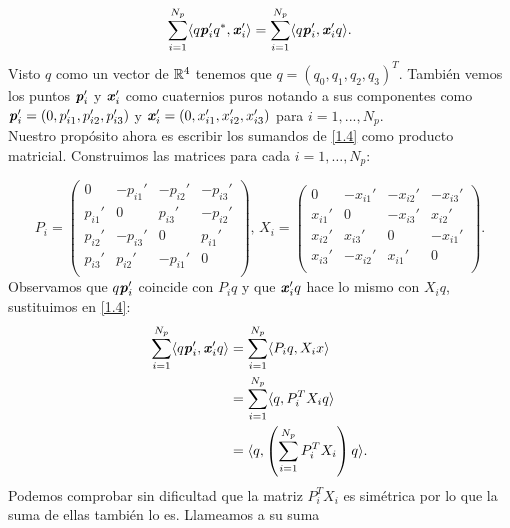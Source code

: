 		\begin{equation}\label{1.4}
		\sum_{i=1}^{N_p}\langle q\textbf{\emph{p}}_i'q^*, \textbf{\emph{x}}_i'\rangle = 	\sum_{i=1}^{N_p}\langle q\textbf{\emph{p}}_i', \textbf{\emph{x}}_i'q\rangle.
		\end{equation}
		Visto $ q $ como un vector de $ \mathbb{R}^4 $ tenemos que $ q = (q_0, q_1, q_2, q_3)^T$. También vemos los puntos $ \textbf{\emph{p}}_i' $ y $ \textbf{\emph{x}}_i' $ como cuaternios puros notando a sus componentes como $ \textbf{\emph{p}}_i' = (0, p_{i1}', p_{i2}', p_{i3}' ) $ y $ \textbf{\emph{x}}_i' = (0, x_{i1}', x_{i2}', x_{i3}' ) $ para $ i=1,...,N_p $.\\
		
		Nuestro propósito ahora es escribir los sumandos de \eqref{1.4} como producto matricial. Construimos las matrices para cada $ i= 1, \dots, N_p$: 
		
		\begin{equation}\label{covDife}
		P_i = \begin{pmatrix}
		0 & -p_{i1}' &-p_{i2}' &-p_{i3}' \\
		p_{i1}' & 0 & p_{i3}'& -p_{i2}' \\
		p_{i2}' & -p_{i3}' & 0 & p_{i1}' \\
		p_{i3}' & p_{i2}' & -p_{i1}' & 0\\
		\end{pmatrix}
		\text{, }
		X_i = \begin{pmatrix}
		0 & -x_{i1}' &-x_{i2}' &-x_{i3}' \\
		x_{i1}' & 0 & -x_{i3}'& x_{i2}' \\
		x_{i2}' & x_{i3}' & 0 & -x_{i1}' \\
		x_{i3}' & -x_{i2}' & x_{i1}' & 0\\
		\end{pmatrix}.
		\end{equation}	
		Observamos que $ q\textbf{\emph{p}}_i' $ coincide con $ P_i q$  y que $ \textbf{\emph{x}}_i'q $ hace lo mismo con $ X_i q $, sustituimos en \eqref{1.4}:
		\begin{equation*}
		\begin{split}
		\sum_{i=1}^{N_p}\langle q\textbf{\emph{p}}_i', \textbf{\emph{x}}_i'q\rangle &=  \sum_{i=1}^{N_p}\langle P_i q,  X_ix\rangle\\
		&= \sum_{i=1}^{N_p} \langle q ,P_i^T X_i q \rangle\\
		&= \langle q , \left( \sum_{i=1}^{N_p}P_i^T X_i\right) q \rangle.
		\end{split}
		\end{equation*}
		Podemos comprobar sin dificultad que la matriz $ P_i^T X_i $ es simétrica por lo que la suma de ellas también lo es. Llameamos a su suma
